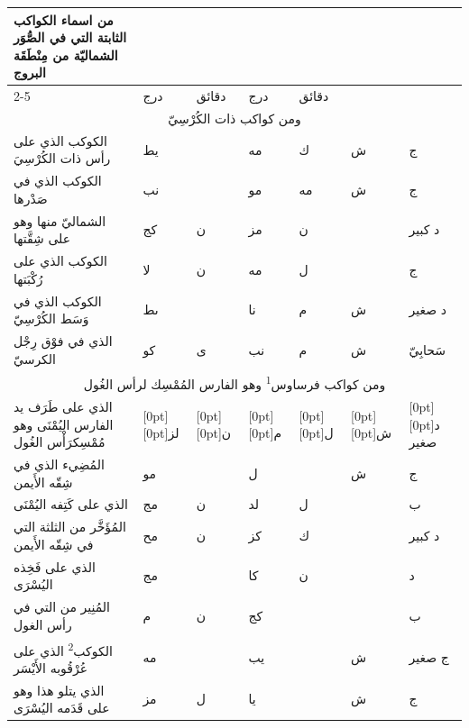 \documentclass[11pt]{article}
\newcommand{\AbjadZero}{{\NallinoSigns\symbol{"E000}}}
\begin{document}
\begin{Arabic}\begin{tabular}{|p{84mm}|>{\centering\arraybackslash}p{9mm}|>{\centering\arraybackslash}p{9mm}|>{\centering\arraybackslash}p{9mm}|>{\centering\arraybackslash}p{9mm}|>{\centering\arraybackslash}p{14mm}|>{\centering\arraybackslash}p{17mm}|}\hline
\multirow{2}{*}{\parbox{80mm}{\centering من اسماء الكواكب الثابتة التي في الصُّوَر الشماليّة من مِنْطَقَة البروج}} & \multicolumn{2}{c|}{الطول} & \multicolumn{2}{c|}{العرض} & \multirow{2}{*}{\parbox{13mm}{\centering\small علامات الجهة}} & \multirow{2}{*}{\parbox{16mm}{\centering\small مراتب العظمة}} \\ \cline{2-5}
 & {\small درج} & {\small دقائق} & {\small درج} & {\small دقائق} & & \\ \hline
\multicolumn{7}{|c|}{\large ومن كواكب ذات الكُرْسِيّ} \\ \hline
الكوكب الذي على رأس ذات الكُرْسِيَ & يط & \AbjadZero{} & مه & ك & ش & ج \\
الكوكب الذي في صَدْرها & نب & \AbjadZero{} & مو & مه & ش & ج \\
الشماليّ منها وهو على شِقَّتها & كج & ن & مز & ن &  & د كبير \\
الكوكب الذي على رُكْبَتها & لا & ن & مه & ل &  & ج \\
الكوكب الذي في وَسَط الكُرْسِيّ & ىط & \AbjadZero{} & نا & م & ش & د صغير \\
الذي في فوْق رِجْل الكرسيّ & كو & ى & نب & م & ش & سَحابِيّ \\
\hline
\multicolumn{7}{|c|}{\large ومن كواكب فرساوس\textsuperscript{1} وهو الفارس المُمْسِك لرأس الغُول} \\ \hline
الذي على طَرَف يد الفارس اليُمْنَى وهو مُمْسِك\newline رَأْس الغُول & \raisebox{-1\normalbaselineskip}[0pt][0pt]{لز} & \raisebox{-1\normalbaselineskip}[0pt][0pt]{ن} & \raisebox{-1\normalbaselineskip}[0pt][0pt]{م} & \raisebox{-1\normalbaselineskip}[0pt][0pt]{ل} & \raisebox{-1\normalbaselineskip}[0pt][0pt]{ش} & \raisebox{-1\normalbaselineskip}[0pt][0pt]{د صغير} \\
المُضِيء الذي في شِقّه الأَيمن & مو & \AbjadZero{} & ل & \AbjadZero{} & ش & ج \\
الذي على كَتِفه اليُمْنَى & مج & ن & لد & ل &  & ب \\
المُؤَخَّر من الثلثة التي في شِقّه الأَيمن & مح & ن & كز & ك &  & د كبير \\
الذي على فَخِذه اليُسْرَى & مج & \AbjadZero{} & كا & ن &  & د \\
المُنِير من التي في رأس الغول & م & ن & كج & \AbjadZero{} &  & ب \\
الكوكب\textsuperscript{2} الذي على عُرْقُوبه الأَيْسَر & مه & \AbjadZero{} & يب & \AbjadZero{} & ش & ج صغير \\
الذي يتلو هذا وهو على قَدَمه اليُسْرَى & مز & ل & يا & \AbjadZero{} & ش & ج \\
\hline
\end{tabular}\end{Arabic}
\end{document}

